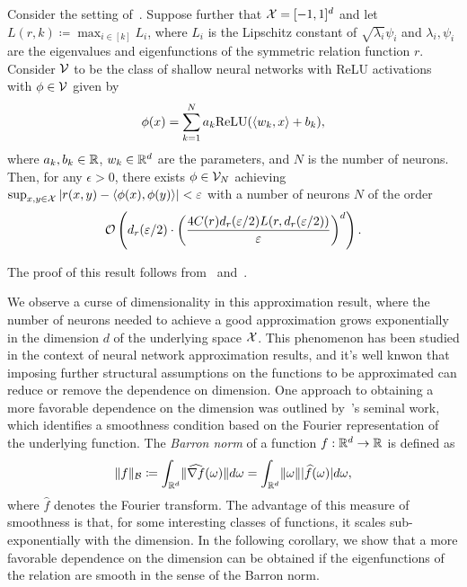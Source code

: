 \begin{corollary}\label{cor:sym_iprod_kernel_neuron_bound}
	Consider the setting of~. Suppose further that ${\mathcal{X}} = [-1, 1]^d$ and let $L(r, k) \coloneq \max_{i \in [k]} L_i$, where $L_i$ is the Lipschitz constant of $\sqrt{\lambda_i} \psi_i$ and $\lambda_i, \psi_i$ are the eigenvalues and eigenfunctions of the symmetric relation function $r$. Consider ${\mathcal{V}}$ to be the class of shallow neural networks with ReLU activations with $\phi \in {\mathcal{V}}$ given by
	\begin{equation*}
		\phi(x) = \sum_{k=1}^{N} a_k \mathrm{ReLU}(\iprod{w_k}{x} + b_k),
	\end{equation*}
	where $a_k, b_k \in \mathbb{R}$, $w_k \in \mathbb{R}^{d}$ are the parameters, and $N$ is the number of neurons. Then, for any $\epsilon > 0$, there exists $\phi \in {\mathcal{V}}_N$ achieving $\sup_{x,y \in \mathcal{X}}{\left\lvert r(x,y) - \left \langle \phi(x), \phi(y) \right\rangle\right\rvert} < \varepsilon$ with a number of neurons $N$ of the order
	\[{\mathcal{O}}\left(d_r(\varepsilon / 2) \cdot \left(\frac{4 C(r) d_r(\varepsilon / 2) L(r, d_r(\varepsilon/2))}{\varepsilon}\right)^{d}\right).\]
\end{corollary}
The proof of this result follows from~ and~\textcite{bachBreakingCurseDimensionality2016}.

We observe a curse of dimensionality in this approximation result, where the number of neurons needed to achieve a good approximation grows exponentially in the dimension $d$ of the underlying space ${\mathcal{X}}$. This phenomenon has been studied in the context of neural network approximation results, and it's well knwon that imposing further structural assumptions on the functions to be approximated can reduce or remove the dependence on dimension. One approach to obtaining a more favorable dependence on the dimension was outlined by~\textcite{barronUniversalApproximation1993}'s seminal work, which identifies a smoothness condition based on the Fourier representation of the underlying function.  The \textit{Barron norm} of a function $f: \mathbb{R}^d \to \mathbb{R}$ is defined as
\[\lVert f\rVert_{{\mathcal{B}}} \coloneq \int_{\mathbb{R}^d} \lVert\widehat{\nabla f}(\omega)\rVert d\omega = \int_{\mathbb{R}^d} \lVert\omega\rVert \lvert\widehat{f}(\omega)\rvert d \omega,\]
where $\hat{f}$ denotes the Fourier transform. The advantage of this measure of smoothness is that, for some interesting classes of functions, it scales sub-exponentially with the dimension. In the following corollary, we show that a more favorable dependence on the dimension can be obtained if the eigenfunctions of the relation are smooth in the sense of the Barron norm.


